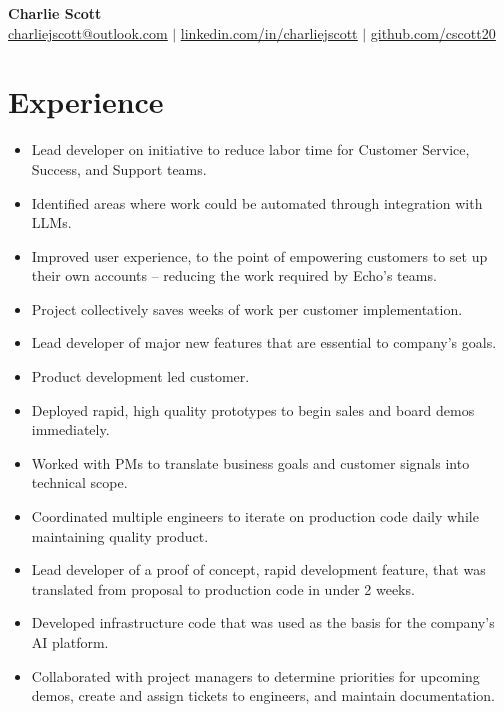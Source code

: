 \documentclass[letterpaper,11pt]{article}
\newenvironment{HeadingList}{
  \begin{mdframed}[
    topline=false,
    bottomline=false,
    rightline=false,
    leftline=false,
    linecolor=gray,
    linewidth=0pt,
    leftmargin=0pt,
    innerleftmargin=0pt,
    innertopmargin=0pt,
    innerbottommargin=0pt,
    innerrightmargin=0pt,
    skipabove=\parsep,
    skipbelow=\parsep,
  ]
  \begin{itemize}[leftmargin=0pt, label={}]
}{
  \end{itemize}
  \end{mdframed}
}
\newenvironment{SubHeadingList}{
  \begin{mdframed}[
    topline=false,
    bottomline=false,
    rightline=false,
    leftline=true,
    linecolor=gray,
    linewidth=.5pt,
    leftmargin=8pt,
    innerleftmargin=8pt,
    innertopmargin=0pt,
    innerbottommargin=0pt,
    innerrightmargin=0pt,
    skipabove=\parsep,
    skipbelow=\parsep,
  ]
  \begin{itemize}[leftmargin=0pt, label={}]
}{
  \end{itemize}
  \end{mdframed}
}
\newenvironment{ItemList}{
  \begin{itemize}[itemsep=4pt, topsep=-3pt, partopsep=0pt, parsep=0pt, leftmargin=20pt, label=\raisebox{0.4ex}{\scalebox{0.5}{\textbullet}}]
}{
  \end{itemize}
}
\newcommand{\Item}[1]{
  \item\small{
    \parbox[t]{460pt}{\raggedright #1}
  }
}
\begin{document}
\begin{center}
    \textbf{\Huge Charlie Scott} \\ \vspace{1pt}
    \href{mailto:charliejscott@outlook.com}{\underline{charliejscott@outlook.com}} $|$
    \href{https://linkedin.com/in/charliejscott}{\underline{linkedin.com/in/charliejscott}} $|$
    \href{https://github.com/cscott20}{\underline{github.com/cscott20}}
\end{center}

\section{Experience}
    \begin{HeadingList}
            \begin{SubHeadingList}
                \begin{ItemList}
                    \Item{Lead developer on initiative to reduce labor time for Customer Service, Success, and Support teams.}
                    \Item{Identified areas where work could be automated through integration with LLMs.}
                    \Item{Improved user experience, to the point of empowering customers to set up their own accounts -- reducing the work required by Echo's teams.}
                    \Item{Project collectively saves weeks of work per customer implementation.}
                \end{ItemList}

                \begin{ItemList}
                    \Item{Lead developer of major new features that are essential to company's goals.}
                    \Item{Product development led customer.}
                    \Item{Deployed rapid, high quality prototypes to begin sales and board demos immediately.}
                    \Item{Worked with PMs to translate business goals and customer signals into technical scope.}
                    \Item{Coordinated multiple engineers to iterate on production code daily while maintaining quality product.}
                \end{ItemList}

                \SubHeading[AI Manager]
                \begin{ItemList}
                    \Item{Lead developer of a proof of concept, rapid development feature, that was translated from proposal to production code in under 2 weeks.}
                    \Item{Developed infrastructure code that was used as the basis for the company's AI platform.}
                    \Item{Collaborated with project managers to determine priorities for upcoming demos, create and assign tickets to engineers, and maintain documentation.}
                \end{ItemList}


\end{SubHeadingList}
\end{HeadingList}
\end{document}
